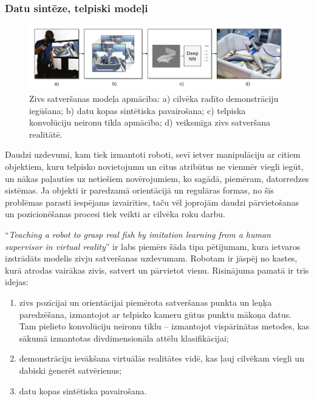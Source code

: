 \documentclass[12pt, a4paper]{article}
\numberwithin{equation}{section} %
\begin{document}
\subsubsection{Datu sintēze, telpiski modeļi}

\begin{figure}[t!]
    \centering
    \includegraphics[width=16cm]{../img/fish.png}
    \caption{Zivs satveršanas modeļa apmācība: a) cilvēka radīto demonstrāciju iegūšana; b) datu kopas sintētiska pavairošana; c) telpiska konvolūciju neironu tīkla apmācība; d) veiksmīga zivs satveršana realitātē. \cite{dyrstad2018teaching}}
\end{figure}

Daudzi uzdevumi, kam tiek izmantoti roboti, sevī ietver manipulāciju ar citiem objektiem, kuru telpisko novietojumu un citus atribūtus ne vienmēr viegli iegūt, un nākas paļauties uz netiešiem novērojumiem, ko sagādā, piemēram, datorredzes sistēmas. Ja objekti ir paredzamā orientācijā un regulāras formas, no šīs problēmas parasti iespējams izvairīties, taču vēl joprojām daudzi pārvietošanas un pozicionēšanas procesi tiek veikti ar cilvēka roku darbu.

``\textit{Teaching a robot to grasp real fish by imitation learning from a human supervisor in virtual reality}'' \cite{dyrstad2018teaching} ir labs piemērs šāda tipa pētījumam, kura ietvaros izstrādāts modelis zivju satveršanas uzdevumam. Robotam ir jāspēj no kastes, kurā atrodas vairākas zivis, satvert un pārvietot vienu. Risinājuma pamatā ir trīs idejas:

\begin{enumerate}
    \item zivs pozīcijai un orientācijai piemērota satveršanas punkta un leņķa paredzēšana, izmantojot ar telpisko kameru gūtus punktu mākoņa datus. Tam pielieto konvolūciju neironu tīklu -- izmantojot vispārinātas metodes, kas sākumā izmantotas divdimensionāla attēlu klasifikācijai;
    \item demonstrāciju ievākšana virtuālās realitātes vidē, kas ļauj cilvēkam viegli un dabiski ģenerēt satvērienus;
    \item datu kopas sintētiska pavairošana.
\end{enumerate}
\end{document}
